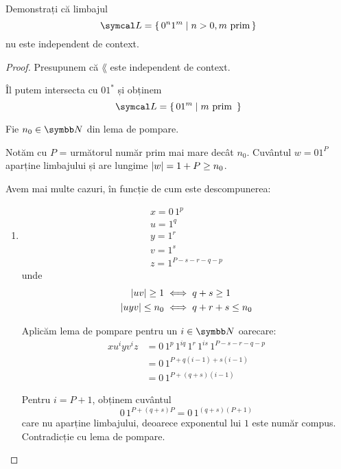 \begin{exercise}
    Demonstrați că limbajul
    \[\lang = \set{ 0^n 1^m | n > 0, m \text{ prim} }\]
    nu este independent de context.
\end{exercise}
\begin{proof}
    Presupunem că \(\lang\) este independent de context.

    Îl putem intersecta cu \(0 1^*\) și obținem
    \[\lang = \set{ 0 1^m | m \text{ prim } }\]

    Fie \(n_0 \in \naturals\) din lema de pompare.

    Notăm cu \(P\) = următorul număr prim mai mare decât \(n_0\).
    Cuvântul \(w = 0 1^P\) aparține limbajului și are lungime \(\left\lvert w\right\rvert = 1 + P \geq n_0\).

    Avem mai multe cazuri, în funcție de cum este descompunerea:
    \begin{enumerate}
        \item
              \begin{gather*}
                  x = 0 \, 1^p \\
                  u = 1^q \\
                  y = 1^r \\
                  v = 1^s \\
                  z = 1^{P - s - r - q - p}
              \end{gather*}
              unde
              \begin{align*}
                  \left\lvert u v\right\rvert \geq 1     & \iff q + s \geq 1       \\
                  \left\lvert u y v\right\rvert \leq n_0 & \iff q + r + s \leq n_0
              \end{align*}

              Aplicăm lema de pompare pentru un \(i \in \naturals\) oarecare:
              \begin{align*}
                  x u^i y v^i z & = 0 \, 1^p \, 1^{iq} \, 1^r \, 1^{is} \, 1^{P - s - r - q - p} \\
                                & = 0 \, 1^{P + q(i - 1) + s(i - 1)}                             \\
                                & = 0 \, 1^{P + (q + s)(i - 1)}
              \end{align*}

              Pentru \(i = P + 1\), obținem cuvântul
              \[0 \, 1^{P + (q + s) P} = 0 \, 1^{(q + s)(P + 1)}\]
              care nu aparține limbajului, deoarece exponentul lui \(1\) este număr compus. Contradicție cu lema de pompare.


\end{enumerate}
\end{proof}
